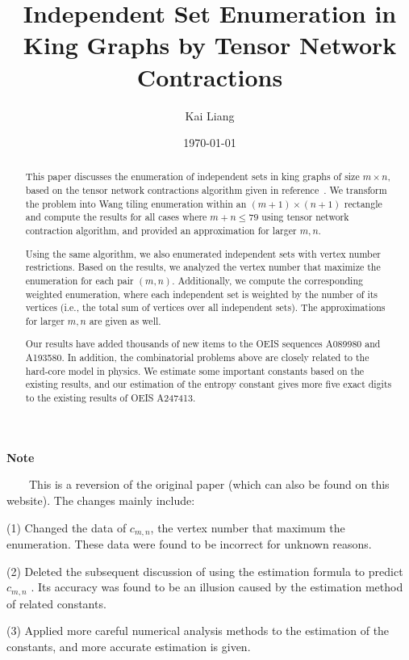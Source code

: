 \documentclass[11pt]{article}
\title{Independent Set Enumeration in King Graphs by Tensor Network Contractions}
\author{Kai Liang}
\date{\today}
\begin{document}
    \maketitle

    \begin{abstract}
        This paper discusses the enumeration of independent sets in king graphs of size $m \times n$, based on the tensor network contractions algorithm given in reference~\cite{tilEnum}.
        We transform the problem into Wang tiling enumeration within an $(m+1) \times (n+1)$ rectangle and compute the results for all cases where $m + n \leq 79$ using tensor network contraction algorithm,
        and provided an approximation for larger $m, n$.

        Using the same algorithm, we also enumerated independent sets with vertex number restrictions.
        Based on the results, we analyzed the vertex number that maximize the enumeration for each pair $(m, n)$.
        Additionally, we compute the corresponding weighted enumeration, where each independent set is weighted by the number of its vertices (i.e., the total sum of vertices over all independent sets).
        The approximations for larger $m, n$ are given as well.

        Our results have added thousands of new items to the OEIS sequences A089980 and A193580.
        In addition, the combinatorial problems above are closely related to the hard-core model in physics.
        We estimate some important constants based on the existing results, and our estimation of the entropy constant gives more five exact digits to the existing results of OEIS A247413.
        \end{abstract}

    \small
    \begin{center}
        \textbf{Note}
    \end{center}
    ~~~~This is a reversion of the original paper (which can also be found on this website).
    The changes mainly include:

    (1) Changed the data of $c_{m,n}$, the vertex number that maximum the enumeration.
    These data were found to be incorrect for unknown reasons.

    (2) Deleted the subsequent discussion of using the estimation formula to predict $c_{m,n}$ .
    Its accuracy was found to be an illusion caused by the estimation method of related constants.

    (3) Applied more careful numerical analysis methods to the estimation of the constants, and more accurate estimation is given.
\end{document}
